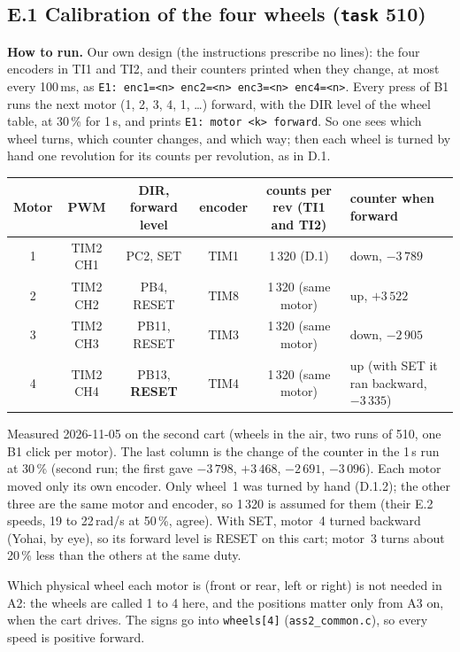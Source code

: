 \documentclass[11pt,a4paper]{article}
\newcommand{\lv}[1]{\texttt{#1}}                 %
\newcommand{\run}[1]{\textbf{How to run.} #1}
\begin{document}
\subsection*{E.1 Calibration of the four wheels (\lv{task} 510)}
\run{Our own design (the instructions prescribe no lines): the four encoders in TI1 and TI2, and their counters
printed when they change, at most every 100\,ms, as \texttt{E1: enc1=<n> enc2=<n> enc3=<n> enc4=<n>}. Every press of
B1 runs the next motor (1, 2, 3, 4, 1, \ldots) forward, with the DIR level of the wheel table, at 30\,\% for
1\,s, and prints \texttt{E1: motor <k> forward}. So one sees which wheel turns, which counter changes, and which way;
then each wheel is turned by hand one revolution for its counts per revolution, as in D.1.}

\smallskip\noindent
\begin{tabularx}{\textwidth}{@{}c c c c c L@{}}
\toprule
Motor & PWM & DIR, forward level & encoder & counts per rev (TI1 and TI2) & counter when forward \\
 & TIM2 CH1 & PC2, SET & TIM1 & 1\,320 (D.1) & down, $-3\,789$ \\
2 & TIM2 CH2 & PB4, RESET & TIM8 & 1\,320 (same motor) & up, $+3\,522$ \\
3 & TIM2 CH3 & PB11, RESET & TIM3 & 1\,320 (same motor) & down, $-2\,905$ \\
4 & TIM2 CH4 & PB13, \textbf{RESET} & TIM4 & 1\,320 (same motor) & up (with SET it ran backward, $-3\,335$) \\
\bottomrule
\end{tabularx}
Measured 2026-11-05 on the second cart (wheels in the air, two runs of 510, one B1 click per motor). The last column
is the change of the counter in the 1\,s run at 30\,\% (second run; the first gave $-3\,798$, $+3\,468$,
$-2\,691$, $-3\,096$). Each motor moved only its own encoder. Only wheel~1 was turned by hand (D.1.2); the other three are the same
motor and encoder, so 1\,320 is assumed for them (their E.2 speeds, 19 to 22\,rad/s at 50\,\%, agree). With SET, motor~4 turned backward (Yohai, by
eye), so its forward level is RESET on this cart; motor~3 turns about 20\,\% less than the others at the same
duty.

\smallskip\noindent
Which physical wheel each motor is (front or rear, left or right) is not needed in A2: the wheels are called 1 to 4
here, and the positions matter only from A3 on, when the cart drives. The signs go into \texttt{wheels[4]} (\texttt{ass2\_common.c}), so every
speed is positive forward.
\end{document}

